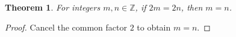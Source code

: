 \documentclass{article}
\newtheorem{theorem}{Theorem}
\begin{document}
\begin{theorem}\label{thm:integer-cancellation-clean}
For integers $m,n\in\mathbb Z$, if $2m=2n$, then $m=n$.
\end{theorem}
\begin{proof}
Cancel the common factor $2$ to obtain $m=n$.
\end{proof}
\end{document}
